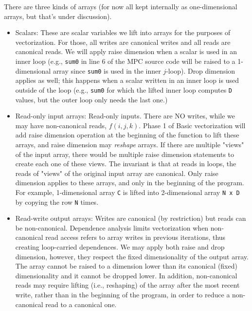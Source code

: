 \documentclass[sigconf, screen, natbib=false, dvipsnames, table]{acmart}
\theoremstyle{definition}
\begin{document}
There are three kinds of arrays (for now all kept internally as one-dimensional arrays, but that's under discussion).
\begin{itemize}

\item Scalars: These are scalar variables we lift into arrays for the purposes of vectorization. 
For those, all writes are canonical writes and all reads are canonical reads. We will apply raise dimension when 
a scalar is used in an inner loop (e.g., \texttt{sum0} in line 6 of the MPC source code will be raised to a 1-dimensional 
array since \texttt{sum0} is used in the inner $j$-loop). Drop dimension applies as well; this happens when a scalar
written in an inner loop is used outside of the loop (e.g., \texttt{sum0} for which the lifted inner loop computes 
\texttt{D} values, but the outer loop only needs the last one.)

\item Read-only input arrays: Read-only inputs. There are NO writes, while we may have non-canonical reads, $f(i,j,k)$. 
Phase 1 of Basic vectorization will add raise dimension operation at the beginning of the function to lift these arrays, 
and raise dimension may \emph{reshape} arrays. If there are multiple "views" of the input array, there would be multiple raise dimension statements to create
each one of these views. The invariant is that at reads in loops, the reads of "views" of the original input array are canonical.
Only raise dimension applies to these arrays, and only in the beginning of the program. For example, 1-dimensional array 
\texttt{C} is lifted into 2-dimensional array \texttt{N x D} by copying the row \texttt{N} times. 
 
 \item Read-write output arrays: Writes are canonical (by restriction) but reads can be non-canonical. 
 Dependence analysis limits vectorization when non-canonical read access refers to array writes in
 previous iterations, thus creating loop-carried dependences. We may apply both raise and drop dimension, however, 
 they respect the fixed dimensionality of the output array. The array cannot be raised to a dimension lower than
 its canonical (fixed) dimensionality and it cannot be dropped lower. In addition, non-canonical reads may 
 require lifting (i.e., reshaping) of the array after the most recent write, rather than in the beginning of the program, 
 in order to reduce a non-canonical read to a canonical one. 

\end{itemize}
\end{document}
